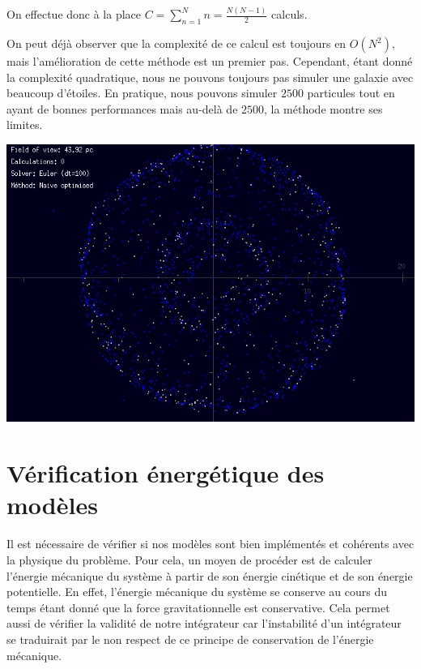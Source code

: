\vspace{2mm}
On effectue donc à la place $C=\sum_{n=1}^N n = \frac{N(N-1)}{2}$ calculs.

\vspace{2mm}
On peut déjà observer que la complexité de ce calcul est toujours  en $O(N^2)$, mais l'amélioration de cette méthode est un premier pas. Cependant, étant donné la complexité quadratique, nous ne pouvons toujours pas simuler une galaxie avec beaucoup d'étoiles. En pratique, nous pouvons simuler $2500$ particules tout en ayant de bonnes performances mais au-delà de $2500$, la méthode montre ses limites.

\begin{center}
\includegraphics[scale=0.8]{images/NO.png}
\captionsetup{hypcap=false}
\label{fig3}
\end{center} 

\section{Vérification énergétique des modèles}

Il est nécessaire de vérifier si nos modèles sont bien implémentés et cohérents avec la physique du problème. Pour cela, un moyen de procéder est de calculer l'énergie mécanique du système à partir de son énergie cinétique et de son énergie potentielle. En effet, l'énergie mécanique du système se conserve au cours du temps étant donné que la force gravitationnelle est conservative.
Cela permet aussi de vérifier la validité de notre intégrateur car l'instabilité d'un intégrateur se traduirait par le non respect de ce principe de conservation de l'énergie mécanique.

